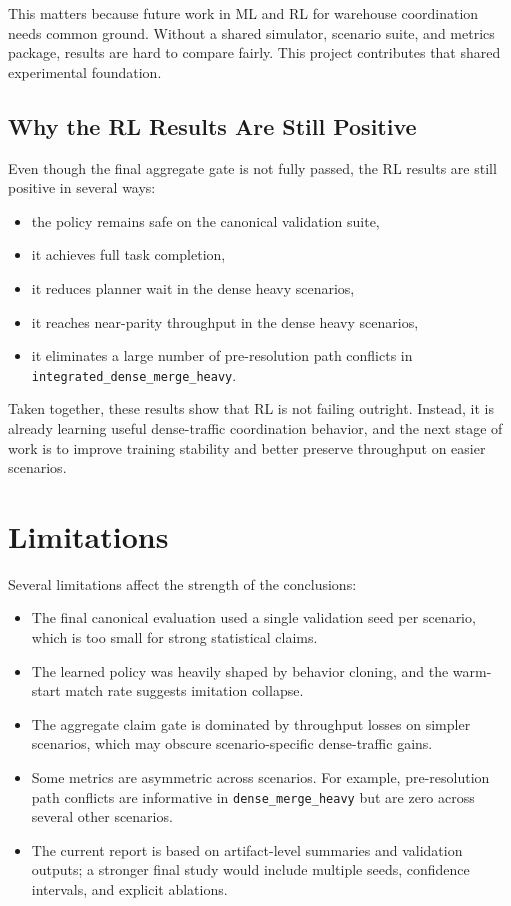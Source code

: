 \documentclass[11pt]{article}
\begin{document}
This matters because future work in ML and RL for warehouse coordination needs common ground. Without a shared simulator, scenario suite, and metrics package, results are hard to compare fairly. This project contributes that shared experimental foundation.

\subsection{Why the RL Results Are Still Positive}
Even though the final aggregate gate is not fully passed, the RL results are still positive in several ways:
\begin{itemize}[leftmargin=1.5em]
    \item the policy remains safe on the canonical validation suite,
    \item it achieves full task completion,
    \item it reduces planner wait in the dense heavy scenarios,
    \item it reaches near-parity throughput in the dense heavy scenarios,
    \item it eliminates a large number of pre-resolution path conflicts in \texttt{integrated\_dense\_merge\_heavy}.
\end{itemize}

Taken together, these results show that RL is not failing outright. Instead, it is already learning useful dense-traffic coordination behavior, and the next stage of work is to improve training stability and better preserve throughput on easier scenarios.

\section{Limitations}
Several limitations affect the strength of the conclusions:
\begin{itemize}[leftmargin=1.5em]
    \item The final canonical evaluation used a single validation seed per scenario, which is too small for strong statistical claims.
    \item The learned policy was heavily shaped by behavior cloning, and the warm-start match rate suggests imitation collapse.
    \item The aggregate claim gate is dominated by throughput losses on simpler scenarios, which may obscure scenario-specific dense-traffic gains.
    \item Some metrics are asymmetric across scenarios. For example, pre-resolution path conflicts are informative in \texttt{dense\_merge\_heavy} but are zero across several other scenarios.
    \item The current report is based on artifact-level summaries and validation outputs; a stronger final study would include multiple seeds, confidence intervals, and explicit ablations.
\end{itemize}
\end{document}
